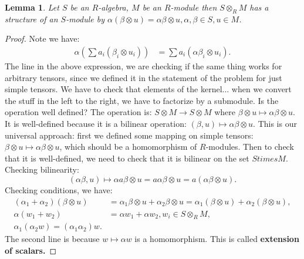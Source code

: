 \documentclass[9pt,reqno,twoside]{amsbook}
\theoremstyle{plain}
\numberwithin{section}{chapter}
\numberwithin{equation}{chapter}
\newtheorem{lem}[theorem]{Lemma}
\theoremstyle{definition}
\theoremstyle{remark}
\theoremstyle{plain}
\newcommand{\bee}{\begin{equation}\begin{aligned}}
\newcommand{\eee}{\end{aligned}\end{equation}}
\newcommand{\tens}{\otimes}
\begin{document}
\begin{lem}
Let $S$ be an $R$-algebra, $M$ be an $R$-module then $S \tens_R M$ has a structure of an $S$-module by $\alpha(\beta \tens u) = \alpha \beta \tens u, \alpha,\beta \in S,u \in M$. 
\end{lem}

\begin{proof}
Note we have: 
\bee
\alpha\left( \sum a_i(\beta_i \tens u_i)\right) &= \sum a_i ( \alpha \beta_i \tens u_i).
\eee
The line in the above expression, we are checking if the same thing works for arbitrary tensors, since we defined it in the statement of the problem for just simple tensors. We have to check that elements of the kernel... when we convert the stuff in the left to the right, we have to factorize by a submodule. Is the operation well defined? The operation is: $S \tens M \to S \tens M$ where $\beta \tens u \mapsto \alpha \beta \tens u$. It is well-defined because it is a bilinear operation: $(\beta,u) \mapsto \alpha\beta \tens u$. This is our universal approach: first we defined some mapping on simple tensors: $\beta \tens u \mapsto \alpha \beta \tens u$, which should be a homomorphism of $R$-modules. Then to check that it is well-defined, we need to check that it is bilinear on the set $S times M$. Checking bilinearity: 
$$
(\alpha \beta, u) \mapsto \alpha a \beta \tens u = a \alpha \beta \tens u = a(\alpha \beta \tens u).
$$
Checking conditions, we have: 
\bee
(\alpha_1 + \alpha_2)(\beta \tens u) &= \alpha_1 \beta \tens u + \alpha_2 \beta \tens u = \alpha_1(\beta \tens u) + \alpha_2(\beta \tens u),\\
\alpha(w_1 + w_2) &= \alpha w_1 + \alpha w_2,w_i \in S \tens_R M,\\
\alpha_1(\alpha_2w) = (\alpha_1 \alpha_2)w.
\eee
The second line is because $w \mapsto \alpha w$ is a homomorphism. This is called \textbf{extension of scalars. }
\end{proof}
\end{document}
